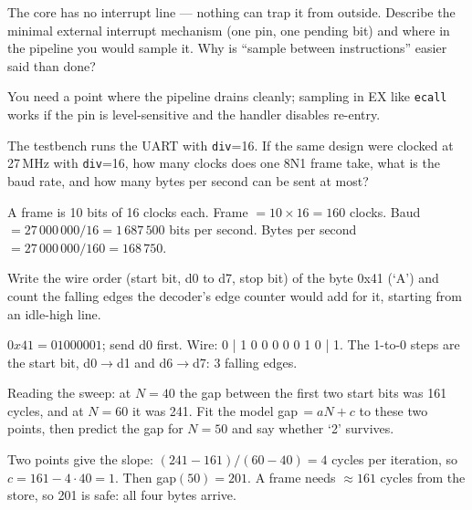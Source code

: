 \begin{exercise}[hard]

The core has no interrupt line --- nothing can trap it from outside.
Describe the minimal external interrupt mechanism (one pin, one
pending bit) and where in the pipeline you would sample it. Why is
``sample between instructions'' easier said than done?
\end{exercise}
\begin{solution}[hint]
You need a point where the pipeline drains cleanly; sampling
in EX like \texttt{ecall} works if the pin is level-sensitive and
the handler disables re-entry.
\end{solution}

\begin{exercise}[easy]
The testbench runs the UART with \texttt{div}=16. If the same design
were clocked at 27\,MHz with \texttt{div}=16, how many clocks does one
8N1 frame take, what is the baud rate, and how many bytes per second can
be sent at most?
\end{exercise}
\begin{solution}[hint]
A frame is 10 bits of 16 clocks each.
Frame $=10\times16=160$ clocks. Baud $=27\,000\,000/16=1\,687\,500$
bits per second. Bytes per second $=27\,000\,000/160=168\,750$.
\end{solution}

\begin{exercise}[medium]
Write the wire order (start bit, d0 to d7, stop bit) of the byte 0x41
(`A') and count the falling edges the decoder's edge counter would add
for it, starting from an idle-high line.
\end{exercise}
\begin{solution}[hint]
$0x41=01000001$; send d0 first.
Wire: 0 | 1 0 0 0 0 0 1 0 | 1. The 1-to-0 steps are the start bit,
d0$\to$d1 and d6$\to$d7: 3 falling edges.
\end{solution}

\begin{exercise}[medium]
Reading the sweep: at \(N=40\) the gap between the first two start
bits was 161 cycles, and at \(N=60\) it was 241. Fit the model
gap\,$=aN+c$ to these two points, then predict the gap for \(N=50\)
and say whether `2' survives.
\end{exercise}
\begin{solution}[hint]
Two points give the slope: $(241-161)/(60-40)=4$ cycles per iteration,
so $c=161-4\cdot40=1$. Then gap$(50)=201$. A frame needs $\approx161$
cycles from the store, so 201 is safe: all four bytes arrive.
\end{solution}
